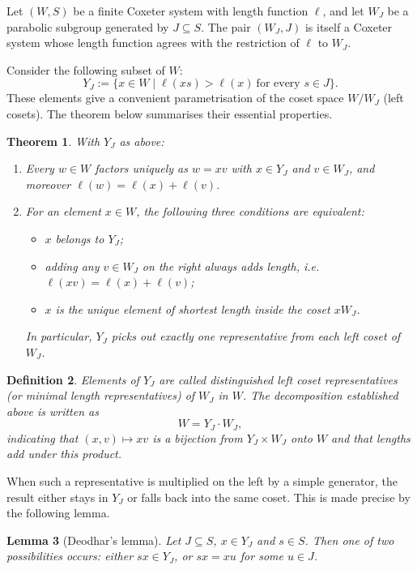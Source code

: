 \documentclass[12pt]{article}
\newtheorem{theorem}{Theorem}[section]
\newtheorem{lemma}[theorem]{Lemma}
\newtheorem{definition}[theorem]{Definition}
\theoremstyle{remark}
\begin{document}
Let $(W,S)$ be a finite Coxeter system with length function $\ell$, and let $W_J$ be a parabolic subgroup generated by $J\subseteq S$. The pair $(W_J,J)$ is itself a Coxeter system whose length function agrees with the restriction of $\ell$ to $W_J$.

Consider the following subset of $W$:
\[
Y_J := \{ x\in W \mid \ell(xs) > \ell(x) \ \text{for every } s\in J \}.
\]
These elements give a convenient parametrisation of the coset space $W/W_J$ (left cosets). The theorem below summarises their essential properties.

\begin{theorem}\label{thm:dist-reps}
With $Y_J$ as above:
\begin{enumerate}
\item[(a)] Every $w\in W$ factors uniquely as $w = x v$ with $x\in Y_J$ and $v\in W_J$, and moreover $\ell(w) = \ell(x) + \ell(v)$.
\item[(b)] For an element $x\in W$, the following three conditions are equivalent:
  \begin{itemize}
  \item[(i)] $x$ belongs to $Y_J$;
  \item[(ii)] adding any $v\in W_J$ on the right always adds length, i.e.\ $\ell(xv)=\ell(x)+\ell(v)$;
  \item[(iii)] $x$ is the unique element of shortest length inside the coset $x W_J$.
  \end{itemize}
  In particular, $Y_J$ picks out exactly one representative from each left coset of $W_J$.
\end{enumerate}
\end{theorem}

\begin{definition}
Elements of $Y_J$ are called \emph{distinguished left coset representatives} (or \emph{minimal length representatives}) of $W_J$ in $W$. The decomposition established above is written as
\[
W = Y_J \cdot W_J,
\]
indicating that $(x,v)\mapsto xv$ is a bijection from $Y_J\times W_J$ onto $W$ and that lengths add under this product.
\end{definition}

When such a representative is multiplied on the left by a simple generator, the result either stays in $Y_J$ or falls back into the same coset. This is made precise by the following lemma.

\begin{lemma}[Deodhar's lemma]
Let $J\subseteq S$, $x\in Y_J$ and $s\in S$. Then one of two possibilities occurs: either $sx\in Y_J$, or $sx = x u$ for some $u\in J$.
\end{lemma}
\end{document}
